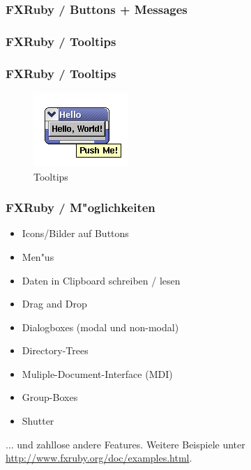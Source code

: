 \documentclass{beamer}
\begin{document}
\begin{frame}
  \frametitle{FXRuby / Buttons + Messages}
  
\end{frame}

\begin{frame}
  \frametitle{FXRuby / Tooltips}
  
\end{frame}

\begin{frame}
  \frametitle{FXRuby / Tooltips}
  \begin{figure}
    \includegraphics[scale=1.0]{code/hello-with-tooltip.png} 
    \caption{Tooltips}
  \end{figure}
\end{frame}

\begin{frame}
  \frametitle{FXRuby / M"oglichkeiten}
  \begin{itemize}
    \item Icons/Bilder auf Buttons
    \item Men"us
    \item Daten in Clipboard schreiben / lesen
    \item Drag and Drop
    \item Dialogboxes (modal und non-modal)
    \item Directory-Trees
    \item Muliple-Document-Interface (MDI)
    \item Group-Boxes
    \item Shutter
  \end{itemize}
  ... und zahllose andere Features. Weitere Beispiele unter \href{http://www.fxruby.org/doc/examples.html}{http://www.fxruby.org/doc/examples.html}.

\end{frame}

\end{document}
